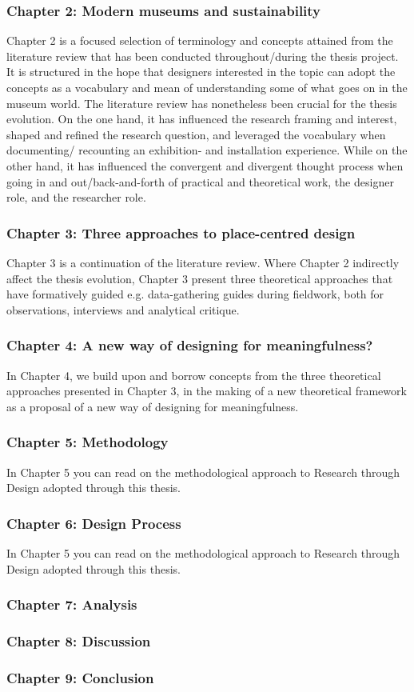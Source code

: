 \subsubsection{Chapter 2: Modern museums and sustainability}
Chapter 2 is a focused selection of terminology and concepts attained from the literature review that has been conducted throughout/during the thesis project. It is structured in the hope that designers interested in the topic can adopt the concepts as a vocabulary and mean of understanding some of what goes on in the museum world. The literature review has nonetheless been crucial for the thesis evolution. On the one hand, it has influenced the research framing and interest, shaped and refined the research question, and leveraged the vocabulary when documenting/ recounting an exhibition- and installation experience. While on the other hand, it has influenced the convergent and divergent thought process when going in and out/back-and-forth of practical and theoretical work, the designer role, and the researcher role.

\subsubsection{Chapter 3: Three approaches to place-centred design }
Chapter 3 is a continuation of the literature review. Where Chapter 2 indirectly affect the thesis evolution, Chapter 3 present three theoretical approaches that have formatively guided e.g. data-gathering guides during fieldwork, both for observations, interviews and analytical critique.

\subsubsection{Chapter 4: A new way of designing for meaningfulness?}
In Chapter 4, we build upon and borrow concepts from the three theoretical approaches presented in Chapter 3, in the making of a new theoretical framework as a proposal of a new way of designing for meaningfulness.

\subsubsection{Chapter 5: Methodology}
In Chapter 5 you can read on the methodological approach to Research through Design adopted through this thesis.  

\subsubsection{Chapter 6: Design Process}
In Chapter 5 you can read on the methodological approach to Research through Design adopted through this thesis.  


\subsubsection{Chapter 7: Analysis}
\subsubsection{Chapter 8: Discussion}
\subsubsection{Chapter 9: Conclusion}

